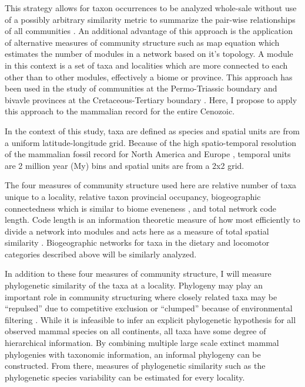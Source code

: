 \documentclass[11pt,letterpaper]{article}
\begin{document}
This strategy allows for taxon occurrences to be analyzed whole-sale without use of a possibly arbitrary similarity metric to summarize the pair-wise relationships of all communities \citep{Sidor2013}. An additional advantage of this approach is the application of alternative measures of community structure such as map equation \citep{Rosvall2008,Rosvall2009a} which estimates the number of modules in a network based on it's topology. A module in this context is a set of taxa and localities which are more connected to each other than to other modules, effectively a biome or province. This approach has been used in the study of communities at the Permo-Triassic boundary \citep{Sidor2013} and bivavle provinces at the Cretaceous-Tertiary boundary \citep{Vilhena2013}. Here, I propose to apply this approach to the mammalian record for the entire Cenozoic.

In the context of this study, taxa are defined as species and spatial units are from a uniform latitude-longitude grid. Because of the high spatio-temporal resolution of the mammalian fossil record for North America and Europe \citep{Alroy2009,Marcot2014,Fortelius2002,Jernvall2004}, temporal units are 2 million year (My) bins and spatial units are from a 2x2 grid.

The four measures of community structure used here are relative number of taxa unique to a locality, relative taxon provincial occupancy, biogeographic connectedness which is similar to biome eveneness \citep{Sidor2013}, and total network code length. Code length is an information theoretic measure of how most efficiently to divide a network into modules and acts here as a measure of total spatial similarity \citep{Rosvall2008,Rosvall2009a}. Biogeographic networks for taxa in the dietary and locomotor categories described above will be similarly analyzed.

In addition to these four measures of community structure, I will measure phylogenetic similarity of the taxa at a locality. Phylogeny may play an important role in community structuring where closely related taxa may be ``repulsed'' due to competitive exclusion or ``clumped'' because of environmental filtering \citep{Webb2002}. While it is infeasible to infer an explicit phylogenetic hypothesis for all observed mammal species on all continents, all taxa have some degree of hierarchical information. By combining multiple large scale extinct mammal phylogenies with taxonomic information, an informal phylogeny can be constructed. From there, measures of phylogenetic similarity such as the phylogenetic species variability \citep{Helmus2007a} can be estimated for every locality. 
\end{document}
